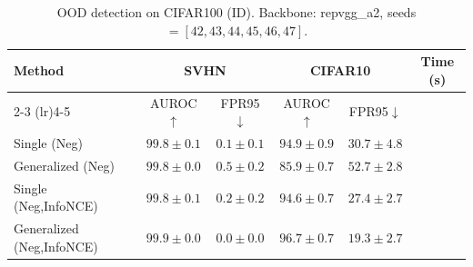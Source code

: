 \begin{table}[h!]
\centering
\caption{OOD detection on CIFAR100 (ID). Backbone: repvgg_a2, seeds$=[42, 43, 44, 45, 46, 47]$.}
\footnotesize
\begin{tabular}{lccccc}
\toprule
\textbf{Method} & \multicolumn{2}{c}{\textbf{SVHN}} & \multicolumn{2}{c}{\textbf{CIFAR10}} & \textbf{Time (s)} \\
\cmidrule(lr){2-3}
\cmidrule(lr){4-5}
 & AUROC$\uparrow$ & FPR95$\downarrow$ & AUROC$\uparrow$ & FPR95$\downarrow$ & \\
\midrule
Single (Neg) 
& $99.8 \pm 0.1$ 
& $0.1 \pm 0.1$ 
& $94.9 \pm 0.9$ 
& $30.7 \pm 4.8$ \\
Generalized (Neg) 
& $99.8 \pm 0.0$ 
& $0.5 \pm 0.2$ 
& $85.9 \pm 0.7$ 
& $52.7 \pm 2.8$ \\
Single (Neg,InfoNCE) 
& $99.8 \pm 0.1$ 
& $0.2 \pm 0.2$ 
& $94.6 \pm 0.7$ 
& $27.4 \pm 2.7$ \\
Generalized (Neg,InfoNCE) 
& $99.9 \pm 0.0$ 
& $0.0 \pm 0.0$ 
& $96.7 \pm 0.7$ 
& $19.3 \pm 2.7$ \\
\bottomrule
\end{tabular}
\end{table}